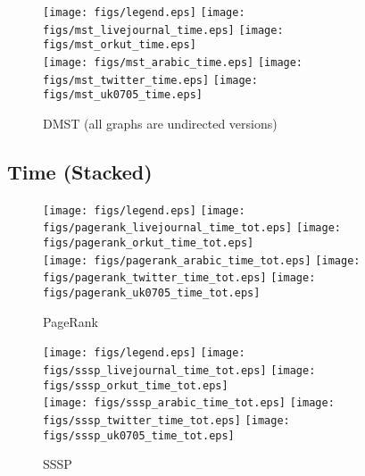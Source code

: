 \documentclass{article}
\newcommand{\bline}[1][1]{\vspace{#1\baselineskip}}
\begin{document}
\begin{figure}[!h]
  \bline[3.5]
  \centering
  \texttt{[image: figs/legend.eps]}\hspace{3em}%
  \texttt{[image: figs/mst\_livejournal\_time.eps]}\hspace{1em}%
  \texttt{[image: figs/mst\_orkut\_time.eps]}\\
  \texttt{[image: figs/mst\_arabic\_time.eps]}\hspace{1em}%
  \texttt{[image: figs/mst\_twitter\_time.eps]}\hspace{1em}%
  \texttt{[image: figs/mst\_uk0705\_time.eps]}
  \caption{DMST (all graphs are undirected versions)}
\end{figure}

\pagebreak
\subsection{Time (Stacked)}
\begin{figure}[!h]
  \bline[1]
  \centering
  \texttt{[image: figs/legend.eps]}\hspace{3em}%
  \texttt{[image: figs/pagerank\_livejournal\_time\_tot.eps]}\hspace{1em}%
  \texttt{[image: figs/pagerank\_orkut\_time\_tot.eps]}\\
  \texttt{[image: figs/pagerank\_arabic\_time\_tot.eps]}\hspace{1em}%
  \texttt{[image: figs/pagerank\_twitter\_time\_tot.eps]}\hspace{1em}%
  \texttt{[image: figs/pagerank\_uk0705\_time\_tot.eps]}
  \caption{PageRank}
\end{figure}

\begin{figure}[!h]
  \bline[3.5]
  \centering
  \texttt{[image: figs/legend.eps]}\hspace{3em}%
  \texttt{[image: figs/sssp\_livejournal\_time\_tot.eps]}\hspace{1em}%
  \texttt{[image: figs/sssp\_orkut\_time\_tot.eps]}\\
  \texttt{[image: figs/sssp\_arabic\_time\_tot.eps]}\hspace{1em}%
  \texttt{[image: figs/sssp\_twitter\_time\_tot.eps]}\hspace{1em}%
  \texttt{[image: figs/sssp\_uk0705\_time\_tot.eps]}
  \caption{SSSP}
\end{figure}
\end{document}
